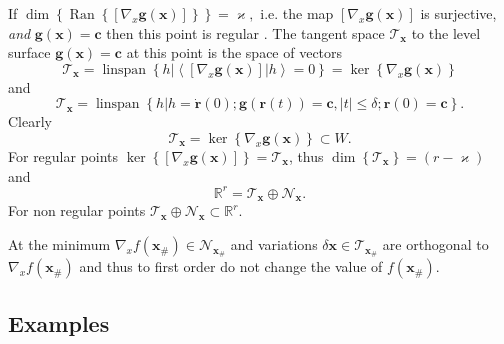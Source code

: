 \documentclass[aps,preprint]{revtex4}%
\begin{document}
If $\dim\left\{  \operatorname{Ran}\left\{  \left[  \nabla_{x}\boldsymbol{g}%
\left(  \boldsymbol{x}\right)  \right]  \right\}  \right\}  =\varkappa,$ i.e.
the map $\left[  \nabla_{x}\boldsymbol{g}\left(  \boldsymbol{x}\right)
\right]  $ is surjective, \emph{and }$\boldsymbol{g}\left(  \boldsymbol{x}%
\right)  =\boldsymbol{c}$ then this point is regular \cite{Hestenes}. The
tangent space $\mathcal{T}_{\boldsymbol{x}}$ to the level surface
$\boldsymbol{g}\left(  \boldsymbol{x}\right)  =\boldsymbol{c}$ at this point
is the space of vectors
\[
\mathcal{T}_{\boldsymbol{x}}=\operatorname{linspan}\left\{  h\left\vert
\left\langle \left.  \left[  \nabla_{x}\boldsymbol{g}\left(  \boldsymbol{x}%
\right)  \right]  \right\vert h\right\rangle =0\right.  \right\}
=\ker\left\{  \nabla_{x}\boldsymbol{g}\left(  \boldsymbol{x}\right)  \right\}
\]
and
\begin{equation}
\mathcal{T}_{\boldsymbol{x}}=\operatorname{linspan}\left\{  h\left\vert
h=\mathbf{\dot{r}}\left(  0\right)  ;\boldsymbol{g}\left(  \mathbf{r}\left(
t\right)  \right)  =\boldsymbol{c},\left\vert t\right\vert \leq\delta
;\mathbf{r}\left(  0\right)  =\boldsymbol{c}\right.  \right\}  .
\end{equation}
Clearly
\begin{equation}
\mathcal{T}_{\boldsymbol{x}}=\ker\left\{  \nabla_{x}\boldsymbol{g}\left(
\boldsymbol{x}\right)  \right\}  \subset W.
\end{equation}
For regular points $\ker\left\{  \left[  \nabla_{x}\boldsymbol{g}\left(
\boldsymbol{x}\right)  \right]  \right\}  =\mathcal{T}_{\boldsymbol{x}}$, thus
$\dim\left\{  \mathcal{T}_{\boldsymbol{x}}\right\}  =\left(  r-\varkappa
\right)  $ and
\begin{equation}
\mathbb{R}^{r}=\mathcal{T}_{\boldsymbol{x}}\oplus\mathcal{N}_{\boldsymbol{x}}.
\end{equation}
For non regular points $\mathcal{T}_{\boldsymbol{x}}\oplus\mathcal{N}%
_{\boldsymbol{x}}\subset\mathbb{R}^{r}.$

At the minimum $\nabla_{x}f\left(  \boldsymbol{x}_{\#}\right)  \in
\mathcal{N}_{\boldsymbol{x}_{\#}}$ and variations $\delta\boldsymbol{x\in
}\mathcal{T}_{\boldsymbol{x}_{\#}}$ are orthogonal to $\nabla_{x}f\left(
\boldsymbol{x}_{\#}\right)  $ and thus to first order do not change the value
of $f\left(  \boldsymbol{x}_{\#}\right)  $.

\subsection{Examples}
\end{document}
